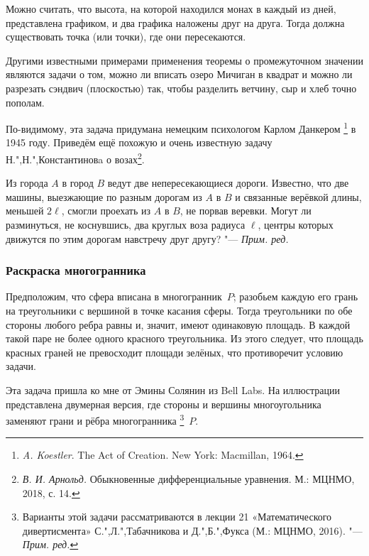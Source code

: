 \documentclass[twoside]{book}
\newenvironment{addedbytheeditors}{\par\medskip\small
}{\par\addvspace{\medskipamount}} %
\begin{document}
Можно считать, что высота, на которой находился монах в каждый из дней, представлена графиком, и два графика наложены друг на друга.
Тогда должна существовать точка (или точки), где они пересекаются.

Другими  известными примерами применения теоремы о промежуточном значении являются задачи о том, можно ли вписать озеро Мичиган в квадрат и можно ли  разрезать сэндвич (плоскостью) так, чтобы разделить ветчину, сыр и хлеб точно пополам.

\begin{addedbytheeditors}
По-видимому, эта задача придумана немецким психологом Карлом Данкером%
\footnote{\emph{A. Koestler}. The Act of Creation. New York: Macmillan, 1964.} в 1945 году.
Приведём ещё похожую и очень известную задачу Н.",Н.",Константиновa о возах\footnote{\emph{В. И. Арнольд.} Обыкновенные дифференциальные уравнения. М.: МЦНМО,
2018, с. 14.}.

Из города $A$ в город $B$ ведут две непересекающиеся дороги.
Известно, что две машины, выезжающие по разным дорогам из $A$ в $B$ и
связанные  верёвкой длины, меньшей $2\ell$, смогли проехать
из $A$ в $B$, не порвав веревки.
Могут ли разминуться, не коснувшись, два круглых воза радиуса $\ell$, центры которых движутся по
этим дорогам навстречу друг другу?
"--- \emph{Прим. ред.}
\end{addedbytheeditors}


\subsubsection*{Раскраска многогранника}%

Предположим, что сфера вписана в многогранник~$P$; разобьем каждую его
грань на треугольники с вершиной в точке касания сферы.
Тогда треугольники по обе стороны любого ребра равны и, значит, имеют одинаковую площадь.
В каждой такой паре не более одного красного треугольника.
Из этого следует, что площадь красных граней не превосходит площади зелёных, что противоречит условию задачи.\heart

\medskip

Эта задача пришла ко мне от Эмины Солянин %
из Bell Labs.
На иллюстрации представлена двумерная версия, где стороны и вершины многоугольника заменяют грани и рёбра многогранника%
\footnote{Варианты этой задачи рассматриваются в лекции 21 «Математического дивертисмента» С.",Л.",Табачникова и Д.",Б.",Фукса (М.: МЦНМО, 2016). "--- \emph{Прим. ред.}}~$P$.
\end{document}
